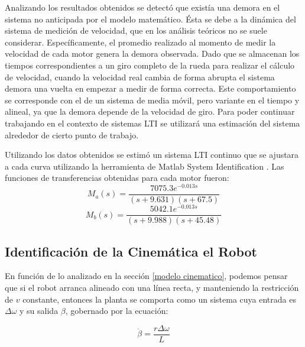 \documentclass[10pt,conference,a4paper,onecolumn]{article}%
\begin{document}
Analizando los resultados obtenidos se detectó que existía una demora en el sistema no anticipada por el modelo matemático. Ésta se debe a la dinámica del sistema de medición de velocidad, que en los análisis teóricos no se suele considerar. Específicamente, el promedio realizado al momento de medir la velocidad de cada motor genera la demora observada. Dado que se almacenan los tiempos correspondientes a un giro completo de la rueda  para realizar el cálculo de velocidad, cuando la velocidad real cambia de forma abrupta el sistema demora una vuelta en empezar a medir de forma correcta. Este comportamiento se corresponde con el de un sistema de media móvil, pero variante en el tiempo y alineal, ya que la demora depende de la velocidad de giro. Para poder continuar trabajando en el contexto de sistemas LTI se utilizará una estimación del sistema alrededor de cierto punto de trabajo. 

Utilizando los datos obtenidos se estimó un sistema LTI continuo que se ajustara a cada curva utilizando la herramienta de Matlab System Identification \cite{Sys_ident}. Las funciones de transferencias obtenidas para cada motor fueron:
\begin{equation}
M_a(s)= \frac{7075.3 e^{-0.013s}}{(s+9.631)(s+67.5)}
\end{equation}
\begin{equation}
M_b(s)= \frac{5042.1 e^{-0.013s}}{(s+9.988) (s+45.48)}
\end{equation}

\subsection{Identificación de la Cinemática el Robot}
En función de lo analizado en la sección \ref{modelo cinematico}, podemos pensar que si el robot arranca alineado con una línea recta, y manteniendo la restricción de $v$ constante, entonces la planta se comporta como un sistema cuya entrada es $\Delta \omega$ y su salida $\beta $, gobernado por la ecuación:

\begin{equation}
\dot{\beta}= \frac{r\Delta\omega}{L} 
\label{eq:sys_tot_teo} 
\end{equation}
\end{document}
